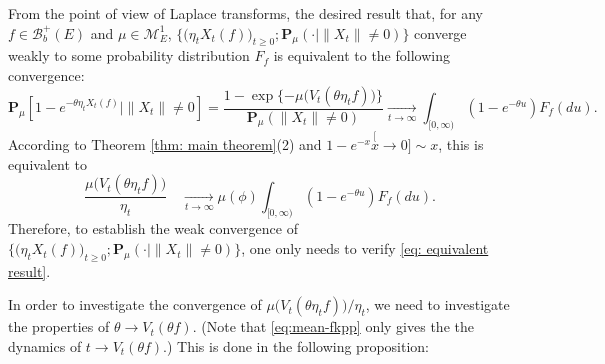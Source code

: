 \documentclass[12pt, a4paper]{amsart}
\theoremstyle{definition}
\numberwithin{equation}{section}
\begin{document}
	From the point of view of Laplace transforms, the desired result that, for any $f\in \mathscr B^+_b(E)$ and $\mu\in \mathcal M_E^1$, $\big\{\big(\eta_t X_t(f)\big)_{t \geq 0}; \mathbf P_{\mu}(\cdot | \|X_t\| \neq 0)\big\}$ converge weakly to some probability distribution 
	$F_f$
	is equivalent to the following convergence:
\begin{equation}
	\mathbf P_\mu[1- e^{-\theta \eta_t X_t(f)} | \|X_t\|\neq 0]
	= \frac{1- \exp\{- \mu\big(V_t(\theta \eta_t f)\big) \}}{\mathbf P_\mu(\|X_t\|\neq 0)}
	\xrightarrow[t\to \infty]{} \int_{[0,\infty)}(1-e^{-\theta u}) F_f(du).
\end{equation}
	According to Theorem \ref{thm: main theorem}(2) and $1-e^{-x} \stackrel[x\to 0]{}{\sim} x$, this is equivalent to
\begin{equation}\label{eq: equivalent result}
	\frac{\mu\big( V_t(\theta \eta_t f) \big)}{ \eta_t}
	\quad \xrightarrow[t\to \infty]{} \mu(\phi) \int_{[0,\infty)}(1-e^{-\theta u})F_{f}(du).
\end{equation}
	Therefore, to establish the weak convergence of $\big\{\big(\eta_t X_t(f)\big)_{t \geq 0}; \mathbf P_{\mu}(\cdot | \|X_t\|\neq 0)\big\}$, one only needs to verify \eqref{eq: equivalent result}.
	
	In order to investigate the convergence of $\mu\big( V_t(\theta \eta_t f) \big)/ \eta_t$, we need to investigate the properties of $\theta\to V_t(\theta f)$.
	(Note that \eqref{eq:mean-fkpp} only gives the the dynamics of $t\to V_t(\theta f)$.)
	This is done in the following proposition:
\end{document}
